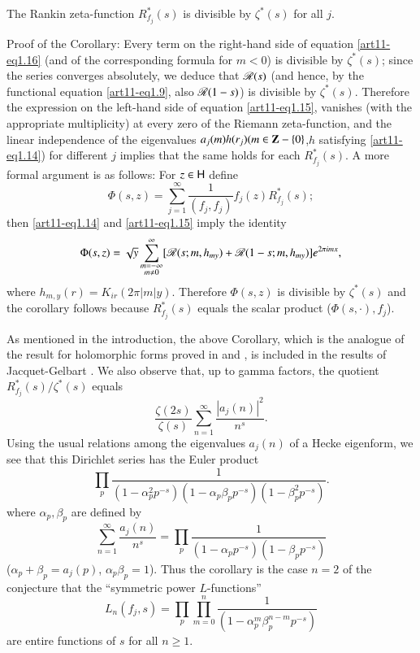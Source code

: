 \begin{coro*}
The Rankin zeta-function $R^\ast_{f_j} (s)$ is divisible by $\zeta^\ast (s)$ for all $j$.
\end{coro*}

\medskip
\noindent
Proof of the Corollary: Every term on the right-hand side of equation \eqref{art11-eq1.16} (and of the corresponding formula for $m < 0$) is divisible by $\zeta^\ast (s)$; since the series converges absolutely, we deduce that $\mathscr{R}(s)$ (and hence, by the functional equation \eqref{art11-eq1.9}, also $\mathscr{R} (1-s)$) is divisible by $\zeta^\ast (s)$. Therefore the expression on the left-hand side of equation \eqref{art11-eq1.15}, vanishes (with the appropriate multiplicity) at every zero of the Riemann zeta-function, and the linear independence of the eigenvalues $a_j(m)h(r_j) (m \in \mathbf{Z} - \{0\}$,\pageoriginale $h$ satisfying \eqref{art11-eq1.14}) for different $j$ implies that the same holds for each $R^\ast_{f_j} (s)$. A more formal argument is as follows: For $z \in \mathsf{H}$ define 
$$
\Phi (s,z) = \sum\limits^\infty_{j=1} \frac{1}{(f_j , f_j)} f_j  (z) R^\ast_{f_j} (s);
$$
then \eqref{art11-eq1.14} and \eqref{art11-eq1.15} imply the identity
$$
\Phi (s, z) = \sqrt{y} \sum\limits^\infty_{\substack{m = - \infty\\ m \neq 0}} [\mathscr{R} (s; m, h_{my}) + \mathscr{R} (1-s; m, h_{my})] e^{2 \pi  i m x},
$$
where $h_{m,y} (r) = K_{ir} (2 \pi |m|y)$. Therefore $\Phi (s, z)$ is divisible by $\zeta^\ast(s)$ and the corollary follows because $R^\ast_{f_j} (s)$ equals the scalar product ($\Phi (s,\cdot), f_j$).

As mentioned in the introduction, the above Corollary, which is the analogue of the result for holomorphic forms proved in \cite{art11-8} and \cite{art11-10}, is included in the results of Jacquet-Gelbart \cite{art11-2}. We also observe that, up to gamma factors, the quotient $R^\ast_{f_j} (s)/ \zeta^\ast(s)$ equals 
$$
\frac{\zeta(2s)}{\zeta(s)} \sum\limits^\infty_{n=1} \frac{|a_j(n)|^2}{n^s}.
$$
Using the usual relations among the eigenvalues $a_j(n)$ of a Hecke eigenform, we see that this Dirichlet series has the Euler product
$$
\prod\limits_p \frac{1}{(1-\alpha^2_p p^{-s})(1-\alpha_p \beta_p p^{-s}) (1-\beta^2_p p^{-s})} . 
$$
where $\alpha_p, \beta_p$ are defined by
$$
\sum\limits^\infty_{n=1} \frac{a_j(n)}{n^s} = \prod\limits_p \frac{1}{(1-\alpha_p p^{-s}) (1-\beta_p p^{-s})}
$$
(\ie $\alpha_p + \beta_p = a_j (p)$, $\alpha_p \beta_p=1$). Thus the corollary is the case $n =2$ of the conjecture that the ``symmetric power $L$-functions''
$$
L_n (f_j , s) = \prod\limits_p \prod\limits^n_{m=0} \frac{1}{(1-\alpha^m_p \beta^{n-m}_p p^{-s})}
$$
are entire functions of $s$ for all $n \geqslant 1$.

